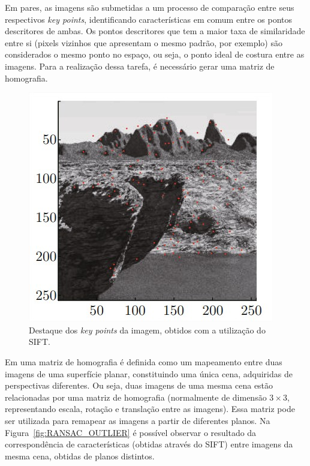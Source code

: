 Em pares, as imagens são submetidas a um processo de comparação entre seus respectivos \textit{key points}, identificando características em comum entre os pontos descritores de ambas. Os pontos descritores que tem a maior taxa de similaridade entre si (pixels vizinhos que apresentam o mesmo padrão, por exemplo) são considerados o mesmo ponto no espaço, ou seja, o ponto ideal de costura entre as imagens. Para a realização dessa tarefa, é necessário gerar uma matriz de homografia.

\begin{figure}[htb]
    \caption{Destaque dos \textit{key points} da imagem, obtidos com a utilização do SIFT.}
    \label{fig:SIFT}
    \centering
	\vspace{0.4cm}
	\begin{minipage}{.7\textwidth}
	    \includegraphics[width=\textwidth]{TCC/Imagens/SIFT.jpg}
	\end{minipage}
\end{figure}

Em \cite{Gledhill:2003} uma matriz de homografia é definida como um mapeamento entre duas imagens de uma superfície planar, constituindo uma única cena, adquiridas de perspectivas diferentes. Ou seja, duas imagens de uma mesma cena estão relacionadas por uma matriz de homografia (normalmente de dimensão $3\times3$, representando escala, rotação e translação entre as imagens). Essa matriz pode ser utilizada para remapear as imagens a partir de diferentes planos. Na Figura~\ref{fig:RANSAC_OUTLIER} é possível observar o resultado da correspondência de características (obtidas através do SIFT) entre imagens da mesma cena, obtidas de planos distintos.

